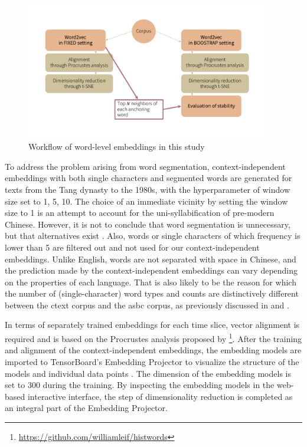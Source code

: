 \begin{figure}[H]
  \centering
  \includegraphics[height=0.4\textheight,width=0.95\textwidth,keepaspectratio]{figures_new/from_slides/workflow_word_level.pdf}
  \caption{Workflow of word-level embeddings in this study}
  \label{fig:workflow_word_level}
\end{figure}

To address the problem arising from word segmentation, context-independent embeddings with both single characters and segmented words are generated for texts from the Tang dynasty to the 1980s, with the hyperparameter of window size set to 1, 5, 10. The choice of an immediate vicinity by setting the window size to 1 is an attempt to account for the uni-syllabification of pre-modern Chinese. However, it is not to conclude that word segmentation is unnecessary, but that alternatives exist \parencite{li2019word}. Also, words or single characters of which frequency is lower than 5 are filtered out and not used for our context-independent embeddings. Unlike English, words are not separated with space in Chinese, and the prediction made by the context-independent embeddings can vary depending on the properties of each language. That is also likely to be the reason for which the number of (single-character) word types and counts are distinctively different between the \gls{ctext} corpus and the \gls{asbc} corpus, as previously discussed in  and .

In terms of separately trained embeddings for each time slice, vector alignment is required and is based on the Procrustes analysis proposed by \textcite{hamilton2016law}\footnote{\url{https://github.com/williamleif/histwords}}. After the training and alignment of the context-independent embeddings, the embedding models are imported to TensorBoard's Embedding Projector to visualize the structure of the models and individual data points \parencite{smilkov2016projector}. The dimension of the embedding models is set to 300 during the training. By inspecting the embedding models in the web-based interactive interface, the step of dimensionality reduction is completed as an integral part of the Embedding Projector.

